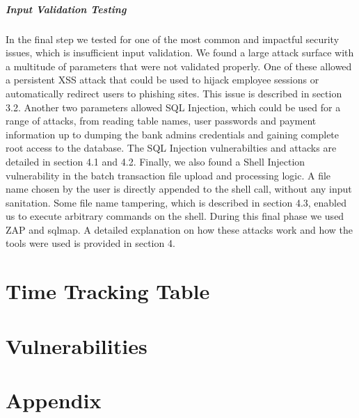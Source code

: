 \documentclass{report}
\begin{document}
\subsubsection{Input Validation Testing}
In the final step we tested for one of the most common and impactful security issues, which is insufficient input validation. We found a large attack surface with a multitude of parameters that were not validated properly. One of these allowed a persistent XSS attack that could be used to hijack employee sessions or automatically redirect users to phishing sites. This issue is described in section 3.2. Another two parameters allowed SQL Injection, which could be used for a range of attacks, from reading table names, user passwords and payment information up to dumping the bank admins credentials and gaining complete root access to the database. The SQL Injection vulnerabilties and attacks are detailed in section 4.1 and 4.2. Finally, we also found a Shell Injection vulnerability in the batch transaction file upload and processing logic. A file name chosen by the user is directly appended to the shell call, without any input sanitation. Some file name tampering, which is described in section 4.3, enabled us to execute arbitrary commands on the shell. During this final phase we used ZAP and sqlmap. A detailed explanation on how these attacks work and how the tools were used is provided in section 4.
\tableofcontents

\part{Time Tracking Table}


\part{Vulnerabilities}




\part*{Appendix}
\appendix

\end{document}
